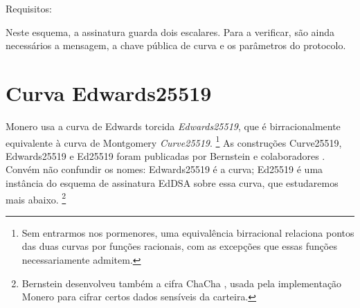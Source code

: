 Requisitos:

Neste esquema, a assinatura guarda dois escalares. Para a verificar, são ainda
necessários a mensagem, a chave pública de curva e os parâmetros do protocolo.




\section{Curva Edwards25519}
\label{Ed25519_section}

%
Monero usa a curva de Edwards torcida {\em Edwards25519}, que é birracionalmente
equivalente à curva de Montgomery {\em Curve25519}.
\footnote{\label{birational_note}Sem entrarmos nos pormenores, uma equivalência
birracional relaciona pontos das duas curvas por funções racionais, com as
excepções que essas funções necessariamente admitem.}
As construções Curve25519, Edwards25519 e Ed25519 foram publicadas por
Bernstein e colaboradores
\cite{curve25519,Bernstein2008,Bernstein2012,Bernstein2007}.
Convém não confundir os nomes: Edwards25519 é a curva; Ed25519 é uma instância
do esquema de assinatura EdDSA sobre essa curva, que estudaremos mais abaixo.
\footnote{Bernstein desenvolveu também a cifra ChaCha
\cite{Bernstein_chacha,chacha-irtf}, usada pela implementação Monero
\cite{monero-source-v16} para cifrar certos
dados sensíveis da carteira.}


